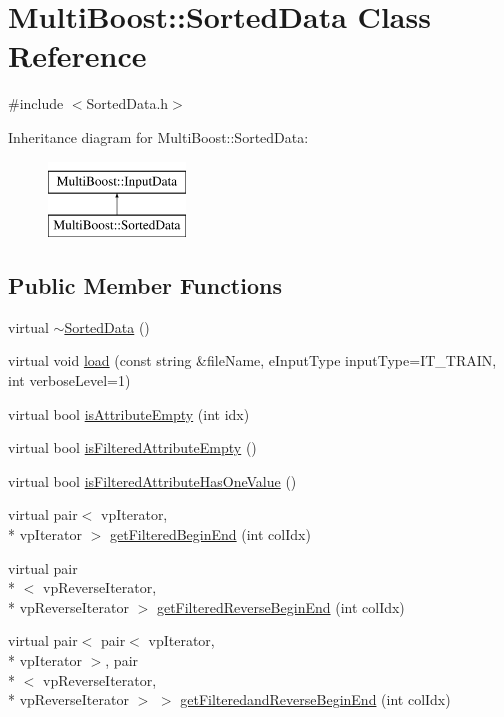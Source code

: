 \hypertarget{classMultiBoost_1_1SortedData}{\section{Multi\-Boost\-:\-:Sorted\-Data Class Reference}
\label{classMultiBoost_1_1SortedData}
}


{\ttfamily \#include $<$Sorted\-Data.\-h$>$}

Inheritance diagram for Multi\-Boost\-:\-:Sorted\-Data\-:\begin{figure}[H]
\begin{center}
\leavevmode
\includegraphics[height=2.000000cm]{classMultiBoost_1_1SortedData}
\end{center}
\end{figure}
\subsection*{Public Member Functions}
\begin{DoxyCompactItemize}
\item 
virtual \hyperlink{classMultiBoost_1_1SortedData_a89df49203a7d967b2e23e3cfb4403262}{$\sim$\-Sorted\-Data} ()
\item 
virtual void \hyperlink{classMultiBoost_1_1SortedData_a4026ff8765982ac0c0edff12a929917f}{load} (const string \&file\-Name, e\-Input\-Type input\-Type=I\-T\-\_\-\-T\-R\-A\-I\-N, int verbose\-Level=1)
\item 
virtual bool \hyperlink{classMultiBoost_1_1SortedData_a993e66c0085455528e18f82c40a58385}{is\-Attribute\-Empty} (int idx)
\item 
virtual bool \hyperlink{classMultiBoost_1_1SortedData_af773a5fb18bfb18207d8c715aebd96d3}{is\-Filtered\-Attribute\-Empty} ()
\item 
virtual bool \hyperlink{classMultiBoost_1_1SortedData_aaa76d92268071910126ae76214ccb6da}{is\-Filtered\-Attribute\-Has\-One\-Value} ()
\item 
virtual pair$<$ vp\-Iterator, \\*
vp\-Iterator $>$ \hyperlink{classMultiBoost_1_1SortedData_a83b6ed8723ff04af5b9d618220887369}{get\-Filtered\-Begin\-End} (int col\-Idx)
\item 
virtual pair\\*
$<$ vp\-Reverse\-Iterator, \\*
vp\-Reverse\-Iterator $>$ \hyperlink{classMultiBoost_1_1SortedData_a4cad1567441921bbb84ed92792ed6eb2}{get\-Filtered\-Reverse\-Begin\-End} (int col\-Idx)
\item 
virtual pair$<$ pair$<$ vp\-Iterator, \\*
vp\-Iterator $>$, pair\\*
$<$ vp\-Reverse\-Iterator, \\*
vp\-Reverse\-Iterator $>$ $>$ \hyperlink{classMultiBoost_1_1SortedData_a86c5a698ca5681859b65ff1ea1a4b67b}{get\-Filteredand\-Reverse\-Begin\-End} (int col\-Idx)
\end{DoxyCompactItemize}
